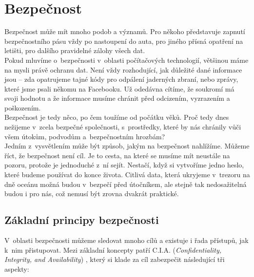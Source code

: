\chapter{Bezpečnost} \label{ch:security}
Bezpečnost může mít mnoho podob a významů. Pro někoho představuje zapnutí bezpečnostního pásu vždy po nastoupení do auta, pro jiného přísná opatření 
na letišti, pro dalšího pravidelné zálohy všech dat. \\

Pokud mluvíme o~bezpečnosti v~oblasti počítačových technologií, většinou máme na mysli právě ochranu dat. Není vždy rozhodující, jak důležité dané 
informace jsou – zda opatrujeme tajné kódy pro odpálení jaderných zbraní, nebo zprávy, které jsme psali někomu na Facebooku. Už odedávna cítíme, 
že soukromí má svoji hodnotu a že informace musíme chránit před odcizením, vyzrazením a poškozením. \\

Bezpečnost je tedy něco, po čem toužíme od počátku věků. Proč tedy dnes nežijeme v~zcela bezpečné společnosti, 
s~prostředky, které by nás chránily vůči všem útokům, podvodům a~bezpečnostním hrozbám? \\

Jedním z~vysvětlením může být způsob, jakým na bezpečnost nahlížíme. Můžeme říct, že  bezpečnost není cíl. Je to cesta, na které se musíme mít 
neustále na pozoru, protože je jednoduché z~ní sejít. Nestačí, když si vytvoříme jedno heslo, které budeme používat do konce života. Citlivá data, 
která ukryjeme v~trezoru na dně oceánu možná budou v~bezpečí před útočníkem, ale stejně tak nedosažitelná budou i pro nás, což nemusí být zrovna 
dvakrát praktické. 

\section{Základní principy bezpečnosti} \label{sec:3:principles}
V~oblasti bezpečnosti můžeme sledovat mnoho cílů a existuje i řada přístupů, jak k~nim přistupovat. Mezi základní koncepty patří C.I.A. 
(\textit{Confidentiality, Integrity, and Availability}) \cite[str. 3]{Goodrich2011}, který si klade za cíl zabezpečit následující tři aspekty: \\

